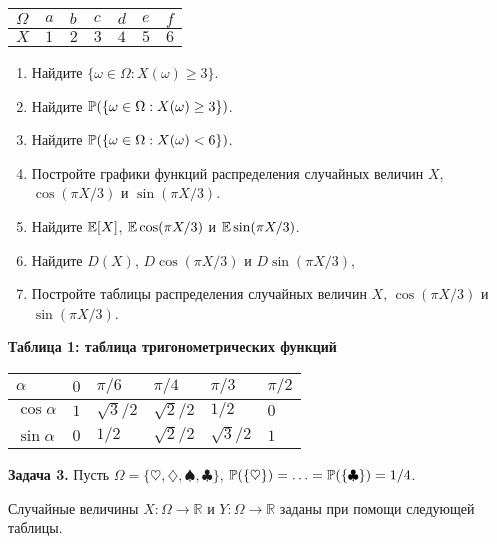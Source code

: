 \begin{tabular}{|p{0.3in}|p{0.3in}|p{0.3in}|p{0.2in}|p{0.3in}|p{0.2in}|p{0.3in}|} \hline 
$\Omega $ & $a$ & $b$ & $c$ & $d$ & $e$ & $f$ \\ \hline 
$X$ & $1$ & $2$ & $3$ & $4$ & $5$ & $6$ \\ \hline 
\end{tabular}

\begin{enumerate}
\item  Найдите $\{ \omega \in \Omega :X(\omega )\ge 3\} $.

\item  Найдите ${\rm {\mathbb P}}(\{ \omega \in \Omega :X(\omega )\ge 3\} )$.

\item  Найдите ${\rm {\mathbb P}}(\{ \omega \in \Omega :X(\omega )<6\} )$.

\item  Постройте графики функций распределения случайных величин $X$, $\cos (\pi X/3)$ и $\sin (\pi X/3)$.

\item  Найдите ${\rm {\mathbb E}}[X]$, ${\rm {\mathbb E}}\cos (\pi X/3)$ и  ${\rm {\mathbb E}}\sin (\pi X/3)$.

\item  Найдите $D(X)$, $D\cos (\pi X/3)$ и $D\sin (\pi X/3)$,

\item  Постройте таблицы распределения случайных величин $X$, $\cos (\pi X/3)$ и $\sin (\pi X/3)$.
\end{enumerate}

\textbf{Таблица 1: таблица тригонометрических функций}

\begin{tabular}{|p{0.4in}|p{0.5in}|p{0.5in}|p{0.5in}|p{0.5in}|p{0.5in}|} \hline 
$\alpha $ & $0$ & $\pi /6$ & $\pi /4$ & $\pi /3$ & $\pi /2$ \\ \hline 
$\cos \alpha $ & $1$ & $\sqrt{3} /2$ & $\sqrt{2} /2$ & $1/2$ & $0$ \\ \hline 
$\sin \alpha $ & $0$ & $1/2$ & $\sqrt{2} /2$ & $\sqrt{3} /2$ & $1$ \\ \hline 
\end{tabular}

\textbf{Задача 3.} Пусть $\Omega =\{ \heartsuit ,\diamondsuit ,\spadesuit ,\clubsuit \} $, ${\rm {\mathbb P}}(\{ \heartsuit \} )=\ldots ={\rm {\mathbb P}}(\{ \clubsuit \} )=1/4$.

Случайные величины $X:\Omega \to {\mathbb R}$ и $Y:\Omega \to {\mathbb R}$ заданы при помощи следующей таблицы.

